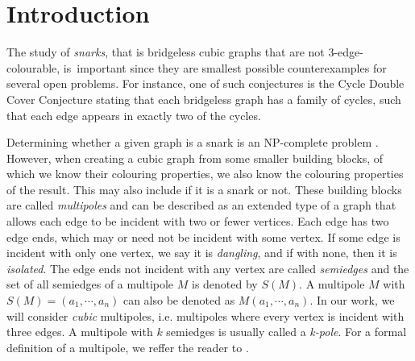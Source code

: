 \section*{Introduction}


The study of \textit{snarks}, that is bridgeless cubic graphs that are not 3-edge-colourable, is~important since they are smallest possible counterexamples for several open problems.
For instance, one of such conjectures is the Cycle Double Cover Conjecture stating that each bridgeless graph has a family of cycles, such that each edge appears in exactly two of the cycles.

Determining whether a given graph is a snark is an NP-complete problem \cite{HolyerNP}. However, when creating a cubic graph from some smaller building blocks, of which we know their colouring properties, we also know the colouring properties of the result. This may also include if it is a snark or not. These building blocks are called \textit{multipoles} and can be described as an extended type of a graph that allows each edge to be incident with two or fewer vertices. Each edge has two edge ends, which may or need not be incident with some vertex. If some edge is incident with only one vertex, we say it is \textit{dangling}, and if with none, then it is \textit{isolated}. The edge ends not incident with any vertex are called \textit{semiedges} and the set of all semiedges of a multipole $M$ is denoted by $S(M)$.
A multipole $M$ with $S(M) = (a_1, \cdots, a_n)$ can also be denoted as $M(a_1,\cdots,a_n)$.
In our work, we will consider \textit{cubic} multipoles, i.e. multipoles where every vertex is incident with three edges. 
A multipole with $k$ semiedges is usually called a \textit{k-pole}.
For a formal definition of a multipole, we reffer the reader to \cite{TODO}.

